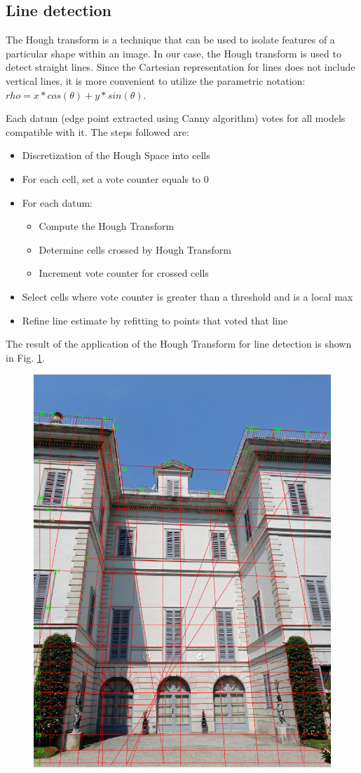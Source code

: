 \documentclass[11pt, oneside]{article}
\begin{document}
\subsection{Line detection}
The Hough transform is a technique that can be used to isolate features of a particular shape within an image. In our case, the Hough transform is used to detect straight lines. Since the Cartesian representation for lines does not include vertical lines, it is more convenient to utilize the parametric notation:
$ rho = x*cos(\theta) + y*sin(\theta) $.

Each datum (edge point extracted using Canny algorithm) votes for all models compatible with it. The steps followed are:
\begin{itemize}
	\item Discretization of the Hough Space into cells
	\item For each cell, set a vote counter equals to 0
	\item For each datum:
		\begin{itemize}
			\item Compute the Hough Transform
			\item Determine cells crossed by Hough Transform
			\item Increment vote counter for crossed cells
		\end{itemize}
	\item Select cells where vote counter is greater than a threshold and is a local max
	\item Refine line estimate by refitting to points that voted that line
\end{itemize}
The result of the application of the Hough Transform for line detection is shown in Fig. \ref{image_lines}.
\begin{figure}[!h]
	\centering
	\includegraphics[width=0.3766\linewidth]{image_lines.png}
	\label{image_lines}
\end{figure}
\end{document}
